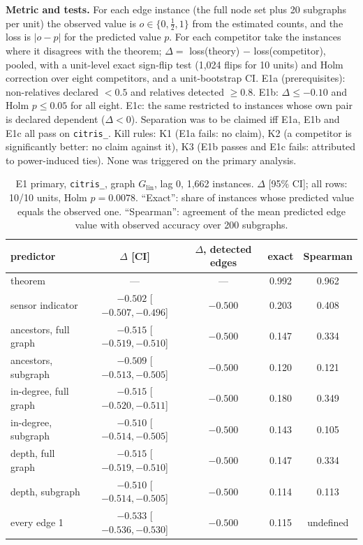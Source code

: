 \textbf{Metric and tests.} For each edge instance (the full node set plus 20 subgraphs per unit) the observed value is
$o\in\{0,\frac12,1\}$ from the estimated counts, and the loss is $|o-p|$ for the predicted value $p$. For each competitor take the instances where it disagrees with the theorem;
$\Delta=$ loss(theory) $-$ loss(competitor), pooled, with a unit-level exact sign-flip test (1{,}024 flips for 10 units) and Holm correction over eight competitors, and a unit-bootstrap CI.
E1a (prerequisites): non-relatives declared $<0.5$ and relatives detected $\ge0.8$. E1b: $\Delta\le-0.10$ and Holm $p\le0.05$ for all eight. E1c: the same restricted to instances whose own pair is declared dependent ($\Delta<0$).
Separation was to be claimed iff E1a, E1b and E1c all pass on \texttt{citris\_}. Kill rules: K1 (E1a fails: no claim), K2 (a competitor is significantly better: no claim against it), K3 (E1b passes and E1c fails: attributed to power-induced ties).
None was triggered on the primary analysis.

\begin{table}[h]
\caption{E1 primary, \texttt{citris\_}, graph $G_{\mathrm{lin}}$, lag 0, 1{,}662 instances. $\Delta$ [95\% CI]; all rows: 10/10 units, Holm $p=0.0078$. ``Exact'': share of instances whose predicted value equals the observed one. ``Spearman'': agreement of the mean predicted edge value with observed accuracy over 200 subgraphs.}
\label{tab:e1prim}
\centering\small
\begin{tabular}{lcccc}
\toprule
predictor & $\Delta$ [CI] & $\Delta$, detected edges & exact & Spearman \\
\midrule
theorem & --- & --- & 0.992 & 0.962 \\
sensor indicator & $-0.502$ [$-0.507,-0.496$] & $-0.500$ & 0.203 & 0.408 \\
ancestors, full graph & $-0.515$ [$-0.519,-0.510$] & $-0.500$ & 0.147 & 0.334 \\
ancestors, subgraph & $-0.509$ [$-0.513,-0.505$] & $-0.500$ & 0.120 & 0.121 \\
in-degree, full graph & $-0.515$ [$-0.520,-0.511$] & $-0.500$ & 0.180 & 0.349 \\
in-degree, subgraph & $-0.510$ [$-0.514,-0.505$] & $-0.500$ & 0.143 & 0.105 \\
depth, full graph & $-0.515$ [$-0.519,-0.510$] & $-0.500$ & 0.147 & 0.334 \\
depth, subgraph & $-0.510$ [$-0.514,-0.505$] & $-0.500$ & 0.114 & 0.113 \\
every edge 1 & $-0.533$ [$-0.536,-0.530$] & $-0.500$ & 0.115 & undefined \\
\bottomrule
\end{tabular}
\end{table}

